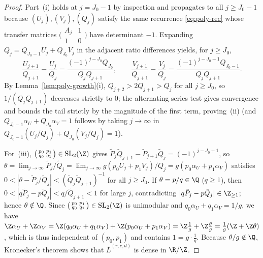 \begin{proof}
Part~(i) holds at $j=J_0-1$ by inspection and propagates to all $j\ge J_0-1$
because $(U_j),(V_j),(Q_j)$ satisfy the same recurrence \eqref{eq:poly-rec} whose
transfer matrices $\bigl(\begin{smallmatrix}A_j&1\\1&0\end{smallmatrix}\bigr)$
have determinant $-1$. Expanding $Q_j=Q_{J_0-1}U_j+Q_{J_0}V_j$ in the adjacent
ratio differences yields, for $j\ge J_0$,
\[
\frac{U_{j+1}}{Q_{j+1}}-\frac{U_j}{Q_j}
=\frac{(-1)^{j-J_0}Q_{J_0}}{Q_jQ_{j+1}},\qquad
\frac{V_{j+1}}{Q_{j+1}}-\frac{V_j}{Q_j}
=\frac{(-1)^{j-J_0+1}Q_{J_0-1}}{Q_jQ_{j+1}}.
\]
By Lemma~\ref{lem:poly-growth}(i), $Q_{j+2}>2Q_{j+1}>Q_j$ for all $j\ge J_0$,
so $1/(Q_jQ_{j+1})$ decreases strictly to $0$; the alternating series test
gives convergence and bounds the tail strictly by the magnitude of the first
term, proving~(ii) (and $Q_{J_0-1}\alpha_U+Q_{J_0}\alpha_V=1$ follows by taking
$j\to\infty$ in $Q_{J_0-1}(U_j/Q_j)+Q_{J_0}(V_j/Q_j)=1$).

For~(iii), $\bigl(\begin{smallmatrix}p_0&p_1\\q_0&q_1\end{smallmatrix}\bigr)\in\mathrm{SL}_2(\Z)$
gives $\tilde P_j\tilde Q_{j+1}-\tilde P_{j+1}\tilde Q_j=(-1)^{j-J_0+1}$, so
$\theta=\lim_{j\to\infty}\tilde P_j/\tilde Q_j=\lim_{j\to\infty}g(p_0U_j+p_1V_j)/Q_j=g(p_0\alpha_U+p_1\alpha_V)$
satisfies $0<|\theta-\tilde P_j/\tilde Q_j|<(\tilde Q_j\tilde Q_{j+1})^{-1}$ for
all $j\ge J_0$. If $\theta=p/q\in\Q$ ($q\ge1$), then
$0<|q\tilde P_j-p\tilde Q_j|<q/\tilde Q_{j+1}<1$ for large $j$, contradicting
$|q\tilde P_j-p\tilde Q_j|\in\Z_{\ge1}$; hence $\theta\notin\Q$. Since
$\bigl(\begin{smallmatrix}p_0&p_1\\q_0&q_1\end{smallmatrix}\bigr)\in\mathrm{SL}_2(\Z)$
is unimodular and $q_0\alpha_U+q_1\alpha_V=1/g$, we have
$\Z\alpha_U+\Z\alpha_V=\Z(q_0\alpha_U+q_1\alpha_V)+\Z(p_0\alpha_U+p_1\alpha_V)
=\Z\frac{1}{g}+\Z\frac{\theta}{g}=\frac{1}{g}(\Z+\Z\theta)$, which is thus
independent of $(p_0,p_1)$ and contains $1=g\cdot\frac{1}{g}$. Because
$\theta/g\notin\Q$, Kronecker's theorem shows that $\bar L^{(r,c,d)}$ is dense
in $\R/\Z$.


\end{proof}
